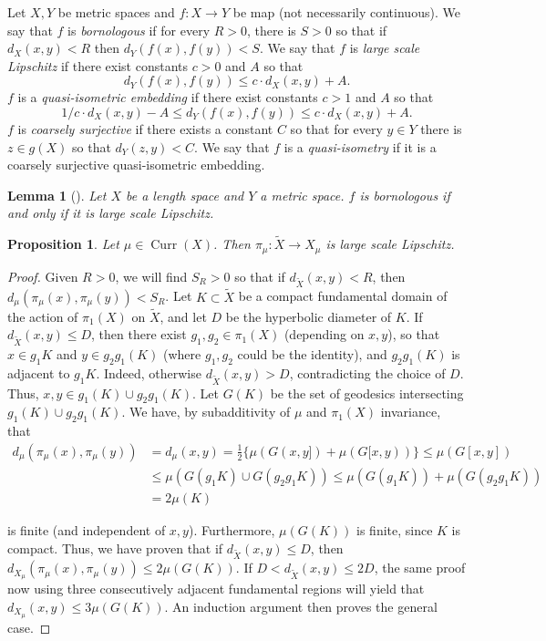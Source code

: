 \documentclass[12pt,article]{amsart}
\numberwithin{equation}{section}
\numberwithin{figure}{section}
\newtheorem{lemma}[equation]{Lemma}
\newtheorem{proposition}[equation]{Proposition}
\theoremstyle{definition}
\theoremstyle{plain}
\DeclareMathOperator{\Curr}{Curr}
\newcommand*{\wt}[1]{\widetilde{#1}}
\begin{document}
Let $X,Y$ be metric spaces and $f \colon X \to Y$ be map (not necessarily continuous).
We say that $f$ is \emph{bornologous} if for every $R>0$, there is $S>0$ so that if 
$d_X(x,y) < R$ then $d_Y(f(x),f(y))<S$.
We say that $f$ is \emph{large scale Lipschitz} if there exist constants $c>0$ and $A$ so that
\[
d_Y(f(x),f(y)) \leq c \cdot d_X(x,y) + A.
\]
$f$ is a \emph{quasi-isometric embedding} if 
there exist constants $c>1$ and $A$ so that
\[
1/c\cdot d_X(x,y) - A \leq d_Y(f(x),f(y)) \leq c \cdot d_X(x,y) + A.
\]
$f$ is \emph{coarsely surjective} if there exists a constant $C$ so that for every $y \in Y$ there is $z \in g(X)$ so that $d_Y(z,y)<C$.
We say that $f$ is a \emph{quasi-isometry} if it is a coarsely surjective quasi-isometric embedding.




\begin{lemma}[{\cite[Lemma~1.10]{Joe03:Coarse}}]
Let $X$ be a length space and $Y$ a metric space.
$f$ is bornologous if and only if it is large scale Lipschitz.
\label{lem:borno}
\end{lemma}

\begin{proposition}
Let $\mu \in \Curr(X)$.
Then $\pi_{\mu} \colon \wt{X} \to X_{\mu}$ is large scale Lipschitz.
\label{prop:largelip}
\end{proposition}
\begin{proof}
Given $R>0$, we will find $S_R>0$ so that if $d_{\wt{X}}(x,y) < R$, then $d_{\mu}(\pi_{\mu}(x),\pi_{\mu}(y))<S_R$.
Let $K \subset \wt{X}$ be a compact fundamental domain of the action of $\pi_1(X)$ on $\wt{X}$, and let $D$ be the hyperbolic diameter of $K$.
If $d_{\wt{X}}(x,y) \leq D$, then there exist $g_1,g_2 \in \pi_1(X)$ (depending on $x,y$), so that $x \in g_1 K$ and $y \in g_2 g_1(K)$ (where $g_1, g_2$ could be the identity), and $g_2 g_1 (K)$ is adjacent to $g_1 K$. Indeed, otherwise $d_{\wt{X}}(x,y) > D$, contradicting the choice of $D$.
Thus, $x,y \in g_1(K) \cup g_2 g_1(K)$.
Let $G(K)$ be the set of geodesics intersecting $g_1(K) \cup g_2 g_1(K)$. We have, by subadditivity of $\mu$ and $\pi_1(X)$ invariance, that
\begin{align*}
d_{\mu} ( \pi_\mu (x) , \pi_\mu (y)) & = d_{\mu}(x,y) = \frac{1}{2} \{ \mu (G (x,y]) + \mu ( G [x,y)) \}  \leq \mu (G [x,y]) \\ & \leq \mu (G(g_1 K) \cup G (g_2 g_1 K)) \leq \mu (G(g_1 K)) + \mu (G(g_2 g_1 K)) \\ & = 2 \mu (K)
\end{align*}

is finite (and independent of $x,y$).
Furthermore, $\mu(G(K))$ is finite, since $K$ is compact.
Thus, we have proven that if $d_{\wt{X}}(x,y) \leq D$, then $d_{X_\mu} (\pi_\mu (x) , \pi_\mu (y) ) \leq 2 \mu (G(K))$.
If $D < d_{\wt{X}}(x,y) \leq 2D$, the same proof now using three consecutively adjacent fundamental regions will yield that $d_{X_\mu}(x,y) \leq 3\mu(G(K))$. An induction argument then proves the general case.
\end{proof}
\end{document}
